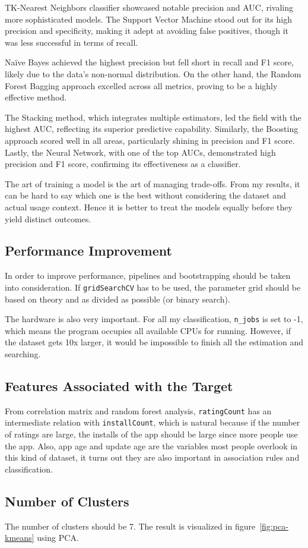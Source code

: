 TK-Nearest Neighbors classifier showcased notable precision and AUC, rivaling more sophisticated models. The Support Vector Machine stood out for its high precision and specificity, making it adept at avoiding false positives, though it was less successful in terms of recall.

Naïve Bayes achieved the highest precision but fell short in recall and F1 score, likely due to the data’s non-normal distribution. On the other hand, the Random Forest Bagging approach excelled across all metrics, proving to be a highly effective method.

The Stacking method, which integrates multiple estimators, led the field with the highest AUC, reflecting its superior predictive capability. Similarly, the Boosting approach scored well in all areas, particularly shining in precision and F1 score. Lastly, the Neural Network, with one of the top AUCs, demonstrated high precision and F1 score, confirming its effectiveness as a classifier.

The art of training a model is the art of managing trade-offs. From my results, it can be hard to say which one is the best without considering the dataset and actual usage context. Hence it is better to treat the models equally before they yield distinct outcomes.

\subsection{Performance Improvement}

In order to improve performance, pipelines and bootstrapping should be taken into consideration. If \texttt{gridSearchCV} has to be used, the parameter grid should be based on theory and as divided as possible (or binary search).

The hardware is also very important. For all my classification, \texttt{n\_jobs} is set to -1, which means the program occupies all available CPUs for running. However, if the dataset gets 10x larger, it would be impossible to finish all the estimation and searching.

\subsection{Features Associated with the Target}

From correlation matrix and random forest analysis, \texttt{ratingCount} has an intermediate relation with \texttt{installCount}, which is natural because if the number of ratings are large, the installs of the app should be large since more people use the app. Also, app age and update age are the variables most people overlook in this kind of dataset, it turns out they are also important in association rules and classification.

\subsection{Number of Clusters}

The number of clusters should be 7. The result is visualized in figure~\ref{fig:pca-kmeans} using PCA.
